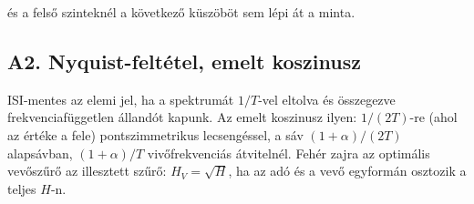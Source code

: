 és a felső szinteknél a következő küszöböt sem lépi át a minta.

\subsection{\texorpdfstring{A2. Nyquist-feltétel, emelt koszinusz}{A2. Nyquist-feltétel, emelt koszinusz}}\label{a6-nyquist}
ISI-mentes az elemi jel, ha a spektrumát $1/T$-vel eltolva és összegezve frekvenciafüggetlen állandót kapunk. Az emelt koszinusz ilyen: $1/(2T)$-re (ahol az értéke a fele) pontszimmetrikus lecsengéssel, a sáv $(1+\alpha)/(2T)$ alapsávban, $(1+\alpha)/T$ vivőfrekvenciás átvitelnél. Fehér zajra az optimális vevőszűrő az illesztett szűrő: $H_V=\sqrt{H}$, ha az adó és a vevő egyformán osztozik a teljes $H$-n.

